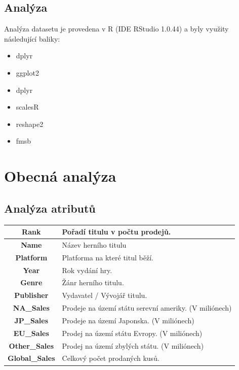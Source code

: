 \documentclass[a4paper,11pt]{article}
\begin{document}
\subsection{Analýza}
Analýza datasetu je provedena v R (IDE RStudio 1.0.44) a byly využity následující baliky:

\begin{itemize}
\item dplyr

\item ggplot2

\item dplyr

\item scalesR

\item reshape2

\item fmsb
\end{itemize}

\newpage

\section{Obecná analýza}


\subsection{Analýza atributů}

\begin{tabular}{|c|l|}
\hline
\textbf{Rank} & Pořadí titulu v počtu prodejů. \\ \hline
\textbf{Name} & Název herního titulu \\ \hline
\textbf{Platform} & Platforma na které titul běží. \\ \hline
\textbf{Year} & Rok vydání hry. \\ \hline
\textbf{Genre} & Žánr herního titulu. \\ \hline
\textbf{Publisher} & Vydavatel / Vývojář titulu. \\ \hline
\textbf{NA\_Sales} & Prodeje na území státu serevní ameriky. (V miliónech) \\ \hline
\textbf{JP\_Sales} & Prodeje na území Japonska. (V miliónech) \\ \hline
\textbf{EU\_Sales} & Prodej na území státu Evropy. (V miliónech) \\ \hline
\textbf{Other\_Sales} & Prodej na území zbylých státu. (V miliónech) \\ \hline
\textbf{Global\_Sales} & Celkový počet prodaných kusů. \\ \hline
\end{tabular}
\end{document}
